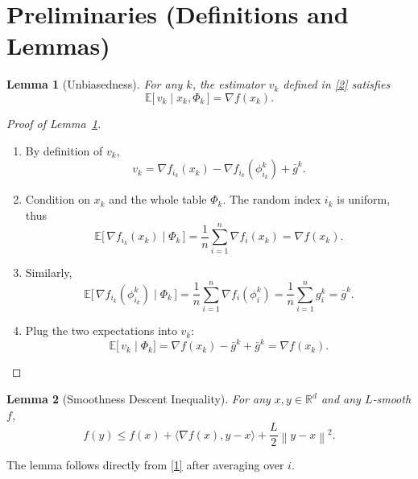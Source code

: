 \documentclass{article}
\newtheorem{lemma}{Lemma}
\newcommand{\EE}{\mathbb{E}}
\newcommand{\RR}{\mathbb{R}}
\newcommand{\norm}[1]{\left\|#1\right\|}
\newcommand{\inner}[2]{\langle #1,#2\rangle}
\begin{document}
\section*{Preliminaries (Definitions and Lemmas)}
\begin{lemma}[Unbiasedness]\label{lem:unbiased}
For any $k$, the estimator $v_k$ defined in \eqref{2} satisfies
\[
\EE\!\bigl[\,v_k\mid x_k,\Phi_k\,\bigr]=\nabla f(x_k).
\]
\end{lemma}
\begin{proof}[Proof of Lemma~\ref{lem:unbiased}]
\begin{enumerate}
\item[Step 1.]  By definition of $v_k$,
\[
v_k = \nabla f_{i_k}(x_k)-\nabla f_{i_k}(\phi_{i_k}^{k})+\bar g^{k}.
\]
\item[Step 2.]  Condition on $x_k$ and the whole table $\Phi_k$.
   The random index $i_k$ is uniform, thus
\[
\EE\bigl[\,\nabla f_{i_k}(x_k)\mid\Phi_k\,\bigr]=\frac1n\sum_{i=1}^{n}\nabla f_i(x_k)=\nabla f(x_k).
\]
\item[Step 3.]  Similarly,
\[
\EE\bigl[\,\nabla f_{i_k}(\phi_{i_k}^{k})\mid\Phi_k\,\bigr]
   =\frac1n\sum_{i=1}^{n}\nabla f_i(\phi_i^{k})=\frac1n\sum_{i=1}^{n}g_i^{k}
   =\bar g^{k}.
\]
\item[Step 4.]  Plug the two expectations into $v_k$:
\[
\EE\!\bigl[\,v_k\mid\Phi_k\bigr]
   =\nabla f(x_k)-\bar g^{k}+\bar g^{k}
   =\nabla f(x_k).
\]
\end{enumerate}
\end{proof}

\begin{lemma}[Smoothness Descent Inequality]\label{lem:smooth}
For any $x,y\in\RR^{d}$ and any $L$‑smooth $f$,
\[
f(y)\le f(x)+\inner{\nabla f(x)}{y-x}
   +\frac{L}{2}\norm{y-x}^{2}.
\]
\end{lemma}
The lemma follows directly from \eqref{1} after averaging over $i$.
\end{document}
